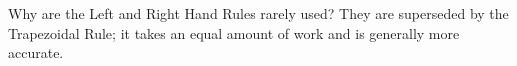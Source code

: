{Why are the Left and Right Hand Rules rarely used?}
{They are superseded by the Trapezoidal Rule; it takes an equal amount of work and is generally more accurate.
}